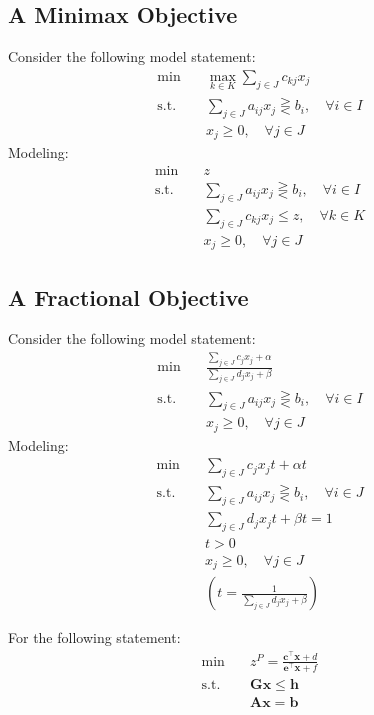 			\subsection{A Minimax Objective}
				Consider the following model statement:
				\begin{align}
					\min \quad & \max_{k\in K}\sum_{j\in J}c_{kj}x_j \\
					\text{s.t.} \quad & \sum_{j\in J}a_{ij}x_j \gtreqless b_i, \quad \forall i\in I \\
					                  & x_j \ge 0, \quad \forall j\in J 
				\end{align}
				Modeling:
				\begin{align}
					\min \quad & z \\
					\text{s.t.} \quad & \sum_{j\in J}a_{ij}x_j \gtreqless b_i, \quad \forall i\in I \\
									  & \sum_{j\in J}c_{kj}x_j \le z, \quad \forall k\in K \\
					                  & x_j \ge 0, \quad \forall j\in J 
				\end{align}
			\subsection{A Fractional Objective}
				Consider the following model statement:
				\begin{align}
					\min \quad & \frac{\sum_{j\in J}c_{j}x_j + \alpha}{\sum_{j\in J}d_{j}x_j + \beta} \\
					\text{s.t.} \quad & \sum_{j\in J}a_{ij}x_j \gtreqless b_i, \quad \forall i\in I \\
					                  & x_j \ge 0, \quad \forall j\in J 
				\end{align}
				Modeling:
				\begin{align}
					\min \quad & \sum_{j\in J}c_{j}x_jt + \alpha t \\
					\text{s.t.} \quad & \sum_{j\in J}a_{ij}x_j \gtreqless b_i, \quad \forall i\in J \\
									  & \sum_{j\in J}d_jx_jt + \beta t = 1\\
									  & t > 0 \\
					                  & x_j \ge 0, \quad \forall j\in J \\
					                  & (t = \frac1{\sum_{j\in J}d_jx_j + \beta}) 
				\end{align}

				For the following statement:
				\begin{align}
					\min \quad & z^P = \frac{\mathbf{c^\top x} + d}{\mathbf{e^\top x} + f}\\
					\text{s.t.} \quad & \mathbf{Gx} \le \mathbf{h}\\
					                  & \mathbf{Ax} = \mathbf{b}
				\end{align}

